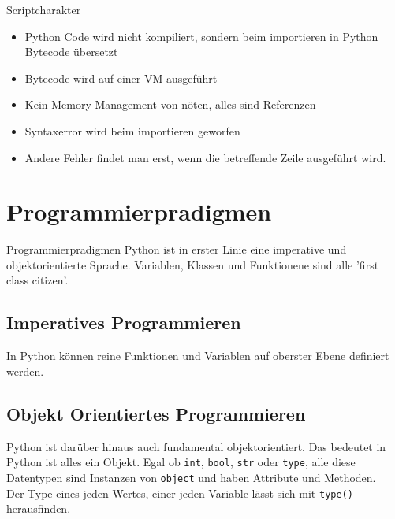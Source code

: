 \begin{frame}[fragile]{Scriptcharakter}
\begin{itemize}
	\item Python Code wird nicht kompiliert, sondern beim importieren in Python Bytecode übersetzt
	\item Bytecode wird auf einer VM ausgeführt
	\item Kein Memory Management von nöten, alles sind Referenzen
	\item Syntaxerror wird beim importieren geworfen
	\item Andere Fehler findet man erst, wenn die betreffende Zeile ausgeführt wird.
\end{itemize}
\end{frame}
	
\section{Programmierpradigmen}
\begin{frame}[fragile]{Programmierpradigmen}
Python ist in erster Linie eine imperative und objektorientierte Sprache. Variablen, Klassen und Funktionene sind alle 'first class citizen'.

\subsection{Imperatives Programmieren}

In Python können reine Funktionen und Variablen auf oberster Ebene definiert werden.

\subsection{Objekt Orientiertes Programmieren}

Python ist darüber hinaus auch fundamental objektorientiert. Das bedeutet in Python ist alles ein Objekt. Egal ob \texttt{int}, \texttt{bool}, \texttt{str} oder \texttt{type}, alle diese Datentypen sind Instanzen von \texttt{object} und haben Attribute und Methoden.\\
Der Type eines jeden Wertes, einer jeden Variable lässt sich mit \texttt{type()} herausfinden.

\end{frame}

